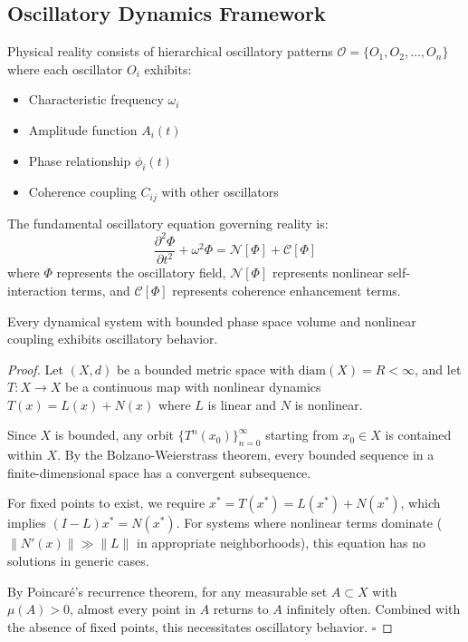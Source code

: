 \documentclass[11pt,a4paper]{article}
\begin{document}
\subsection{Oscillatory Dynamics Framework}

\begin{definition}
Physical reality consists of hierarchical oscillatory patterns $\mathcal{O} = \{O_1, O_2, \ldots, O_n\}$ where each oscillator $O_i$ exhibits:
\begin{itemize}
\item Characteristic frequency $\omega_i$
\item Amplitude function $A_i(t)$
\item Phase relationship $\phi_i(t)$
\item Coherence coupling $C_{ij}$ with other oscillators
\end{itemize}
\end{definition}

The fundamental oscillatory equation governing reality is:
$$\frac{\partial^2 \Phi}{\partial t^2} + \omega^2 \Phi = \mathcal{N}[\Phi] + \mathcal{C}[\Phi]$$
where $\Phi$ represents the oscillatory field, $\mathcal{N}[\Phi]$ represents nonlinear self-interaction terms, and $\mathcal{C}[\Phi]$ represents coherence enhancement terms.

\begin{theorem}
Every dynamical system with bounded phase space volume and nonlinear coupling exhibits oscillatory behavior.
\end{theorem}

\begin{proof}
Let $(X, d)$ be a bounded metric space with $\text{diam}(X) = R < \infty$, and let $T: X \to X$ be a continuous map with nonlinear dynamics $T(x) = L(x) + N(x)$ where $L$ is linear and $N$ is nonlinear.

Since $X$ is bounded, any orbit $\{T^n(x_0)\}_{n=0}^{\infty}$ starting from $x_0 \in X$ is contained within $X$. By the Bolzano-Weierstrass theorem, every bounded sequence in a finite-dimensional space has a convergent subsequence.

For fixed points to exist, we require $x^* = T(x^*) = L(x^*) + N(x^*)$, which implies $(I - L)x^* = N(x^*)$. For systems where nonlinear terms dominate ($\|N'(x)\| \gg \|L\|$ in appropriate neighborhoods), this equation has no solutions in generic cases.

By Poincaré's recurrence theorem, for any measurable set $A \subset X$ with $\mu(A) > 0$, almost every point in $A$ returns to $A$ infinitely often. Combined with the absence of fixed points, this necessitates oscillatory behavior. $\square$
\end{proof}
\end{document}

